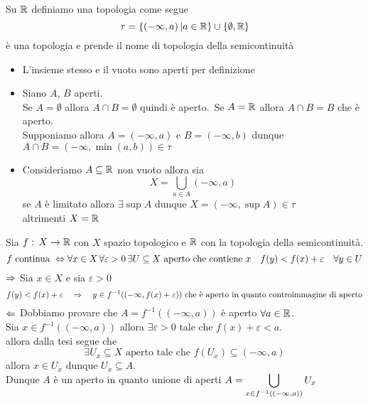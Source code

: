 \begin{ex}\bianco
Su $\mathbb{R}$ definiamo una topologia come segue
$$ \tau= \{ (-\infty , a) \, \vert a \in \mathbb{R} \} \cup \{ \emptyset ,\mathbb{R}\}$$
\`e una topologia e prende il nome di topologia della semicontinuit\`a
\proof \bbianco
\begin{itemize}
\item L'insieme stesso e il vuoto sono aperti per definizione
\item Siano $A$, $B$ aperti.\\
Se $A=\emptyset$  allora $A\cap B=\emptyset$ quindi \`e aperto.\ Se  $A=\mathbb{R}$ allora $A\cap B = B$ che \`e aperto.\\
Supponiamo allora $A=(-\infty , a ) $ e $B=(-\infty,  b)$ dunque $A\cap B = (-\infty, \min(a,b)) \in \tau$
\item Consideriamo  $A\subseteq \mathbb{R}$  non vuoto allora sia
$$ X=\bigcup_{a\in A} (-\infty, a)$$
se $A$ \`e limitato allora $\exists \sup A $ dunque $X=(-\infty , \sup A) \in \tau$\\
altrimenti $X=\mathbb{R}$
\end{itemize}
\end{ex}
\spazio
\begin{ex}Sia $f:\, X\to \mathbb{R}$ con $X$ spazio topologico e $\mathbb{R}$ con la topologia della semicontinuit\`a.
$$ f\text{ continua } \Leftrightarrow \forall x\in X  \, \forall \varepsilon>0 \, \exists U \subseteq X \text{ aperto che contiene } x \quad f(y)<f(x)+\varepsilon \quad \forall y\in U$$
\proof$\Rightarrow$ Sia $x\in X$ e sia $\varepsilon >0$  $$f(y) < f(x)+ \varepsilon \quad \Rightarrow \quad y \in f^{-1}((-\infty, f(x)+\varepsilon)) \text{ che \`e aperto in quanto controimmagine di aperto}$$
$\Leftarrow$ Dobbiamo provare che $A=f^{-1}((-\infty, a))$ \`e aperto $\forall a \in \mathbb{R}$.\\
Sia $x\in f^{-1}((-\infty, a))$ allora $\exists \varepsilon>0$ tale che $f(x) + \varepsilon < a$.\\
allora dalla tesi segue che 
$$ \exists U_x \subseteq X \text{ aperto tale che } f(U_x) \subseteq (-\infty,a)$$
allora $x\in U_x $ dunque $U_x\subseteq A$.\\
Dunque $A$ \`e un aperto in quanto unione di aperti $A = \displaystyle \bigcup_{x\in f^{-1}((-\infty, a))} U_x$
\endproof
\end{ex}

